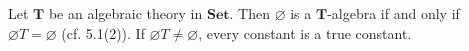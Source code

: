 Let $\mathbf{T}$ be an algebraic theory in $\mathbf{Set}$. Then $\varnothing$ is a $\mathbf{T}$-algebra if and only if $\varnothing T = \varnothing$ (cf. 5.1(2)). If $\varnothing T \neq \varnothing$, every constant is a true constant.
